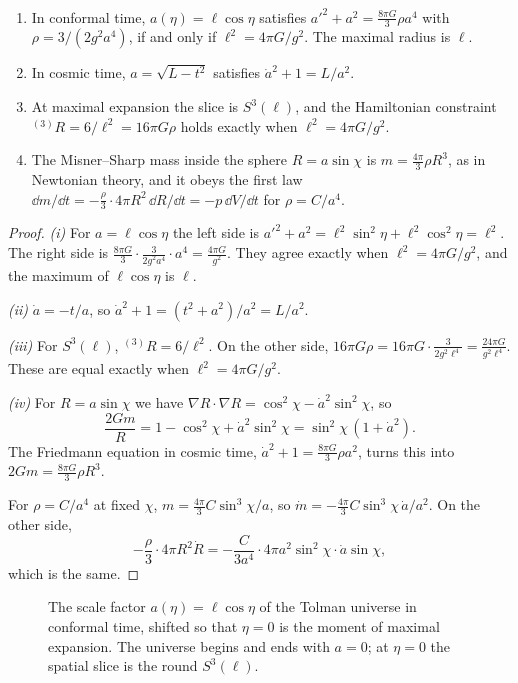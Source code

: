 \begin{theorem}\label{thm:tolman}\ver\
\begin{enumerate}[label=(\roman*)]
\item In conformal time, $a(\eta)=\ell\cos\eta$ satisfies $a'^2+a^2=\frac{8\pi G}3\rho a^4$ with $\rho=3/(2g^2a^4)$, if and only if $\ell^2=4\pi G/g^2$. The maximal radius is $\ell$.
\item In cosmic time, $a=\sqrt{L-t^2}$ satisfies $\dot a^2+1=L/a^2$.
\item At maximal expansion the slice is $S^3(\ell)$, and the Hamiltonian constraint ${}^{(3)}R=6/\ell^2=16\pi G\rho$ holds exactly when $\ell^2=4\pi G/g^2$.
\item The Misner--Sharp mass inside the sphere $R=a\sin\chi$ is $m=\frac{4\pi}3\rho R^3$, as in Newtonian theory, and it obeys the first law $\dd m/\dd t=-\frac\rho3\cdot4\pi R^2\,\dd R/\dd t=-p\,\dd V/\dd t$ for $\rho=C/a^4$.
\end{enumerate}
\end{theorem}
\begin{proof}
\emph{(i)} For $a=\ell\cos\eta$ the left side is $a'^2+a^2=\ell^2\sin^2\eta+\ell^2\cos^2\eta=\ell^2$. The right side is $\frac{8\pi G}3\cdot\frac3{2g^2a^4}\cdot a^4=\frac{4\pi G}{g^2}$. They agree exactly when $\ell^2=4\pi G/g^2$, and the maximum of $\ell\cos\eta$ is $\ell$.

\emph{(ii)} $\dot a=-t/a$, so $\dot a^2+1=(t^2+a^2)/a^2=L/a^2$.

\emph{(iii)} For $S^3(\ell)$, ${}^{(3)}R=6/\ell^2$. On the other side, $16\pi G\rho=16\pi G\cdot\frac3{2g^2\ell^4}=\frac{24\pi G}{g^2\ell^4}$. These are equal exactly when $\ell^2=4\pi G/g^2$.

\emph{(iv)} For $R=a\sin\chi$ we have $\nabla R\cdot\nabla R=\cos^2\chi-\dot a^2\sin^2\chi$, so
\[
\frac{2Gm}R=1-\cos^2\chi+\dot a^2\sin^2\chi=\sin^2\chi\,(1+\dot a^2).
\]
The Friedmann equation in cosmic time, $\dot a^2+1=\frac{8\pi G}3\rho a^2$, turns this into $2Gm=\frac{8\pi G}3\rho R^3$.

For $\rho=C/a^4$ at fixed $\chi$, $m=\frac{4\pi}3C\sin^3\chi/a$, so $\dot m=-\frac{4\pi}3C\sin^3\chi\,\dot a/a^2$. On the other side,
\[
-\frac\rho3\cdot4\pi R^2\dot R=-\frac C{3a^4}\cdot4\pi a^2\sin^2\chi\cdot\dot a\sin\chi ,
\]
which is the same.
\end{proof}


\begin{figure}[t]
\centering
{}
\caption{The scale factor $a(\eta)=\ell\cos\eta$ of the Tolman universe in conformal time, shifted so that $\eta=0$ is the moment of maximal expansion. The universe begins and ends with $a=0$; at $\eta=0$ the spatial slice is the round $S^3(\ell)$.}
\label{fig:tolman}
\end{figure}

